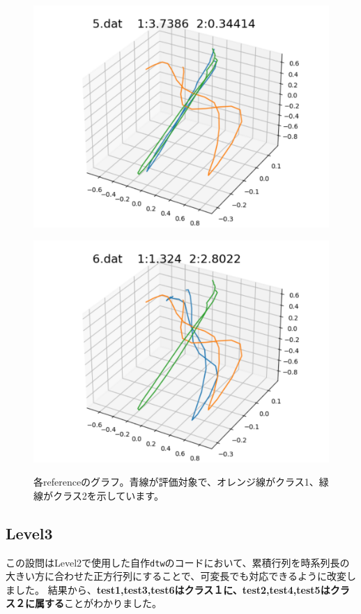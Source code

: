 \begin{figure}[h]
\begin{minipage}[b]{0.32\linewidth}
  \includegraphics[keepaspectratio, scale=0.3]
  {./pic/level2/5_dat.pdf}
  \label{5dat}
 \end{minipage}
  \begin{minipage}[b]{0.32\linewidth}
  \centering
  \includegraphics[keepaspectratio, scale=0.3]
  {./pic/level2/6_dat.pdf}
  \label{6dat}
 \end{minipage}
 \caption{各referenceのグラフ。青線が評価対象で、オレンジ線がクラス1、緑線がクラス2を示しています。}\label{reg_poly}
\end{figure}

\subsection*{Level3}
この設問はLevel2で使用した自作\verb+dtw+のコードにおいて、累積行列を時系列長の大きい方に合わせた正方行列にすることで、可変長でも対応できるように改変しました。
結果から、\textbf{test1,test3,test6はクラス１に、test2,test4,test5はクラス２に属する}ことがわかりました。


